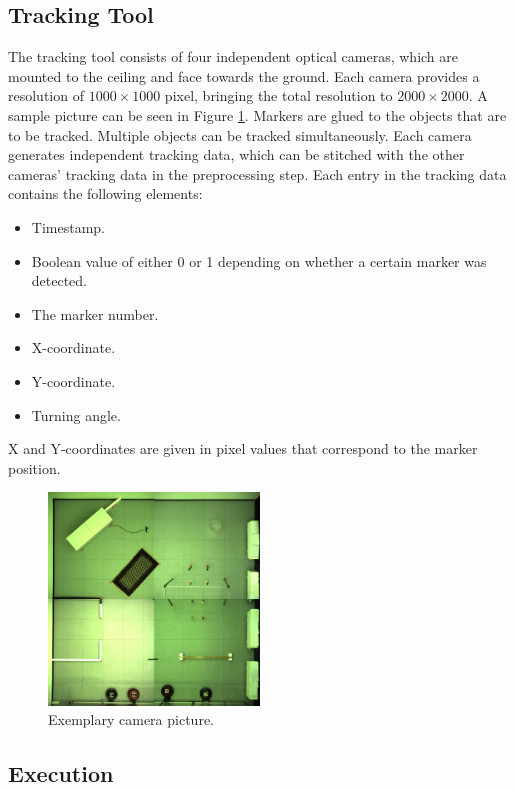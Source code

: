 \documentclass[twoside]{article}
\begin{document}
\subsection{Tracking Tool} %
The tracking tool consists of four independent optical cameras, which are mounted to the ceiling and face towards the ground. Each camera provides a resolution of $1000 \times 1000$ pixel, bringing the total resolution to $2000 \times 2000$. A sample picture can be seen in Figure \ref{fig:setup}. Markers are glued to the objects that are to be tracked. Multiple objects can be tracked simultaneously. Each camera generates independent tracking data, which can be stitched with the other cameras' tracking data in the preprocessing step. Each entry in the tracking data contains the following elements:

\begin{itemize}
	\item Timestamp.
	\item Boolean value of either 0 or 1 depending on whether a certain marker was detected.
	\item The marker number. 
	\item X-coordinate.
	\item Y-coordinate.
	\item Turning angle.
\end{itemize}
X and Y-coordinates are given in pixel values that correspond to the marker position. 

\begin{figure} [H]
	\begin{center}
		\includegraphics[width=0.5\textwidth]{pictures/setup.jpg}
		\caption{Exemplary camera picture.}
		\label{fig:setup}
	\end{center}
\end{figure}


\subsection{Execution} %
\end{document}
